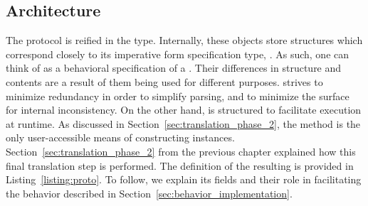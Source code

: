 \subsection{Architecture}
\label{sec:protocol_object_architecture}
The protocol is reified in the  type. Internally, these objects store structures which correspond closely to its imperative form specification type, . As such, one can think of  as a behavioral specification of a . Their differences in structure and contents are a result of them being used for different purposes.  strives to minimize redundancy in order to simplify parsing, and to minimize the surface for internal inconsistency. On the other hand,  is structured to facilitate execution at runtime. As discussed in Section~\ref{sec:translation_phase_2}, the  method is the only user-accessible means of constructing  instances. Section~\ref{sec:translation_phase_2} from the previous chapter explained how this final translation step is performed. The definition of the resulting  is provided in Listing~\ref{listing:proto}. To follow, we explain its fields and their role in facilitating the behavior described in Section~\ref{sec:behavior_implementation}.

